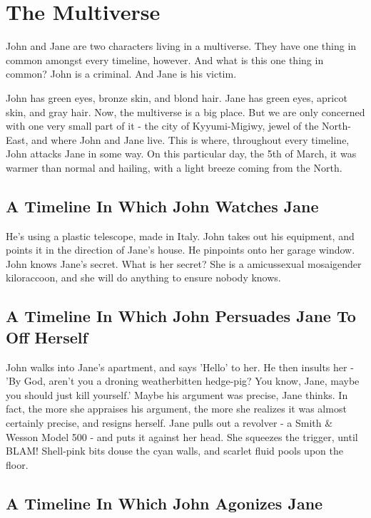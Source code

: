 \documentclass{article}
\begin{document}
\section*{The Multiverse}
John and Jane are two characters living in a multiverse.
They have one thing in common amongst every timeline, however.
And what is this one thing in common?
John is a criminal. And Jane is his victim.


John has green eyes, bronze skin, and blond hair.
Jane has green eyes, apricot skin, and gray hair.
Now, the multiverse is a big place. But we are only concerned with one very small part of it {-} the city of Kyyumi{-}Migiwy, jewel of the North{-}East, and where John and Jane live.
This is where, throughout every timeline, John attacks Jane in some way.
On this particular day, the 5th of March, it was warmer than normal and hailing, with a light breeze coming from the North.

\tableofcontents

\subsection{A Timeline In Which John Watches Jane}


He's using a plastic telescope, made in Italy.
John takes out his equipment, and points it in the direction of Jane's house. He pinpoints onto her garage window.
John knows Jane's secret. What is her secret? She is a amicussexual mosaigender kiloraccoon, and she will do anything to ensure nobody knows.
\subsection{A Timeline In Which John Persuades Jane To Off Herself}


John walks into Jane's apartment, and says 'Hello' to her.
He then insults her {-} 'By God, aren't you a droning weatherbitten hedge{-}pig?
You know, Jane, maybe you should just kill yourself.'
Maybe his argument was precise, Jane thinks.
In fact, the more she appraises his argument, the more she realizes it was almost certainly precise, and resigns herself.
Jane pulls out a revolver {-} a Smith \& Wesson Model 500 {-} and puts it against her head.
She squeezes the trigger, until BLAM!
Shell{-}pink bits douse the cyan walls, and scarlet fluid pools upon the floor.
\subsection{A Timeline In Which John Agonizes Jane}
\end{document}
